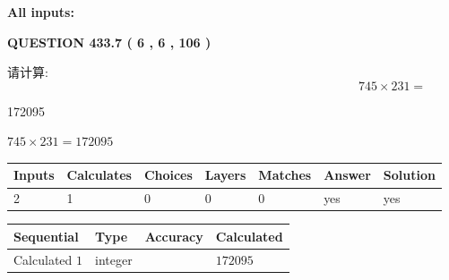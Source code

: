 \documentclass{ctexart}
\begin{document}
   
   
   
\noindent\vspace{0.1in}\hspace{-0.08in} {\textbf{\Large{All inputs: }}}
   
   
  
\vspace{0.2in}
  
{\textbf{\Large{QUESTION
433.7 
 ( 6 , 6 , 106 )
}}}
  
  
 
请计算:
\begin{equation}
745  \times    %
231 = \nonumber
\end{equation}
 
 
 
\noindent{}
 
 

172095
 
 
\noindent{}
 
 

 
 
 
\noindent{}
 
 

$ %
745 \times  %
231=   %
172095$
 
 
\noindent{}
 
 

 
   
   
   
   
\noindent\begin{tabular}{|l|l|l|l|l|l|l|}
 \hline
Inputs & Calculates & Choices & Layers & Matches & Answer & Solution \\ \hline
 2  & 
 1  & 
 0
  & 
 0  & 
 0  & 
  yes & 
  yes 
  \\ \hline
 \end{tabular}
   
   
   
   
\noindent{}
   
   
  
  
\noindent\begin{tabular}{|l|l|l|l|}
\hline
 Sequential & Type & Accuracy & Calculated \\ 
\hline
 
 
  Calculated $  1 $ & integer &  & 
  $ 172095 $ 
 \\  \hline  
 \end{tabular}
   
\end{document}
